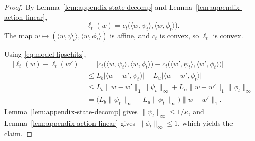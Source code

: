 \documentclass[11pt]{article}
\begin{document}
\begin{proof}
By Lemma~\ref{lem:appendix-state-decomp} and Lemma~\ref{lem:appendix-action-linear},
\[
\ell_t(w)=c_t\bigl(\langle w,\psi_t\rangle,\langle w,\phi_t\rangle\bigr).
\]
The map $w\mapsto (\langle w,\psi_t\rangle,\langle w,\phi_t\rangle)$ is affine, and $c_t$ is convex, so $\ell_t$ is convex.

Using \eqref{eq:model-lipschitz},
\begin{align*}
|\ell_t(w)-\ell_t(w')|
&= \bigl|c_t\bigl(\langle w,\psi_t\rangle,\langle w,\phi_t\rangle\bigr)-c_t\bigl(\langle w',\psi_t\rangle,\langle w',\phi_t\rangle\bigr)\bigr| \\
&\le L_b\bigl|\langle w-w',\psi_t\rangle\bigr| + L_u\bigl|\langle w-w',\phi_t\rangle\bigr| \\
&\le L_b\|w-w'\|_1\|\psi_t\|_\infty + L_u\|w-w'\|_1\|\phi_t\|_\infty \\
&= \bigl(L_b\|\psi_t\|_\infty + L_u\|\phi_t\|_\infty\bigr)\|w-w'\|_1.
\end{align*}
Lemma~\ref{lem:appendix-state-decomp} gives $\|\psi_t\|_\infty\le 1/\kappa$, and Lemma~\ref{lem:appendix-action-linear} gives $\|\phi_t\|_\infty\le 1$, which yields the claim.
\end{proof}





\end{document}

